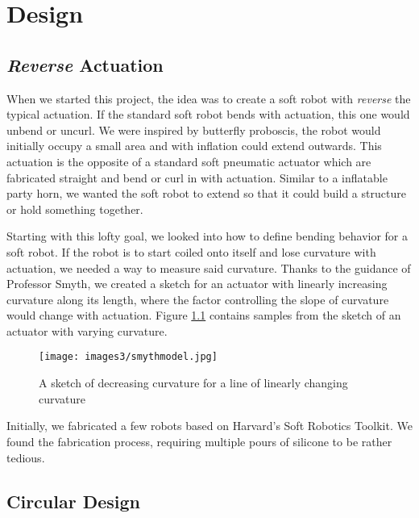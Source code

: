 \chapter{Design}
\section{\emph{Reverse} Actuation}

When we started this project, the idea was to create a soft robot with \emph{reverse} the typical actuation. If the standard soft robot bends with actuation, this one would unbend or uncurl. We were inspired by butterfly proboscis, the robot would initially occupy a small area and with inflation could extend outwards. This actuation is the opposite of a standard soft pneumatic actuator which are fabricated straight and bend or curl in with actuation. Similar to a inflatable party horn, we wanted the soft robot to extend so that it could build a structure or hold something together. 

Starting with this lofty goal, we looked into how to define bending behavior for a soft robot. If the robot is to start coiled onto itself and lose curvature with actuation, we needed a way to measure said curvature. Thanks to the guidance of Professor Smyth, we created a sketch for an actuator with linearly increasing curvature along its length, where the factor controlling the slope of curvature would change with actuation. Figure \ref{fig:smythmodel} contains samples from the sketch of an actuator with varying curvature. 

\begin{figure}
    \centering
    \texttt{[image: images3/smythmodel.jpg]}
    \caption{A sketch of decreasing curvature for a line of linearly changing curvature}
    \label{fig:smythmodel}
\end{figure}


Initially, we fabricated a few robots based on Harvard's Soft Robotics Toolkit. We found the fabrication process, requiring multiple pours of silicone to be rather tedious. 

\section{Circular Design}
